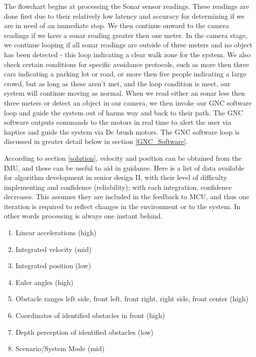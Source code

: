\noindent The flowchart begins at processing the Sonar sensor readings. These readings are done first due to their relatively low latency and accuracy for determining if we are in need of an immediate stop. We then continue onward to the camera readings if we have a sonar reading greater then one meter. In the camera stage, we continue looping if all sonar readings are outside of three meters and no object has been detected - this loop indicating a clear walk zone for the system. We also check certain conditions for specific avoidance protocols, such as more then three cars indicating a parking lot or road, or more then five people indicating a large crowd, but as long as these aren't met, and the loop condition is meet, our system will continue moving as normal. When we read either an sonar less then three meters or detect an object in our camera, we then invoke our GNC software loop and guide the system out of harms way and back to their path. The GNC software outputs commands to the motors in real time to alert the user via haptics and guide the system via Dc brush motors. The GNC software loop is discussed in greater detail below in section \ref{GNC_Software}. \\


\noindent According to section \ref{solution}, velocity and position can be obtained from the IMU, and these can be useful to aid in guidance. Here is a list of data available for algorithm development in senior design II, with their level of difficulty implementing and confidence (reliability); with each integration, confidence decreases. This assumes they are included in the feedback to MCU, and thus one iteration is required to reflect changes in the environment or to the system. In other words processing is always one instant behind.
\begin{enumerate}[itemsep=0mm]
	\item Linear accelerations (high)
	\item Integrated velocity (mid)
	\item Integrated position (low)
	\item Euler angles (high)
	\item Obstacle ranges left side, front left, front right, right side, front center (high)
	\item Coordinates of identified obstacles in front (high)
	\item Depth perception of identified obstacles (low)
	\item Scenario/System Mode (mid)
\end{enumerate}

